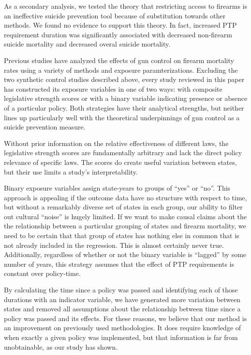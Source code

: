 \documentclass[]{article}
\begin{document}
As a secondary analysis, we tested the theory that restricting access to
firearms is an ineffective suicide prevention tool because of
substitution towards other methods. We found no evidence to support this
theory. In fact, increased PTP requirement duration was significantly
associated with decreased non-firearm suicide mortality and decreased
overal suicide mortality.

Previous studies have analyzed the effects of gun control on firearm
mortality rates using a variety of methods and exposure
paramterizations. Excluding the two synthetic control studies described
above, every study reviewed in this paper has constructed its exposure
variables in one of two ways: with composite legislative strength scores
or with a binary variable indicating presence or absence of a particular
policy. Both strategies have their analytical strengths, but neither
lines up particularly well with the theoretical underpinnings of gun
control as a suicide prevention measure.

Without prior information on the relative effectiveness of different
laws, the legislative strength scores are fundamentally arbitrary and
lack the direct policy relevance of specific laws. The scores do create
useful variation between states, but their use limits a study's
interpretability.

Binary exposure variables assign state-years to groups of ``yes'' or
``no''. This approach is appealing if the outcome data have no structure
with respect to time, but without a remarkably diverse set of states in
each group, our ability to filter out cultural ``noise'' is hugely
limited. If we want to make causal claims about the the relationship
between a particular grouping of states and firearm mortality, we need
to be certain that that group of states has nothing else in common that
is not already included in the regression. This is almost certainly
never true. Additionally, regardless of whether or not the binary
variable is ``lagged'' by some number of years, this strategy assumes
that the effect of PTP requirements is constant over policy-time.

By calculating the time since a policy was passed and identifying each
of those durations with an indicator variable, we have generated more
variation between states and removed all assumptions about the
relationship between time since a policy was passed and its effects. For
these reasons, we believe that our method is an improvement on
previously used methodologies. It does require knowledge of when exactly
a given policy was implemented, but that information is far from
unobtainable, as our study has shown.
\end{document}
